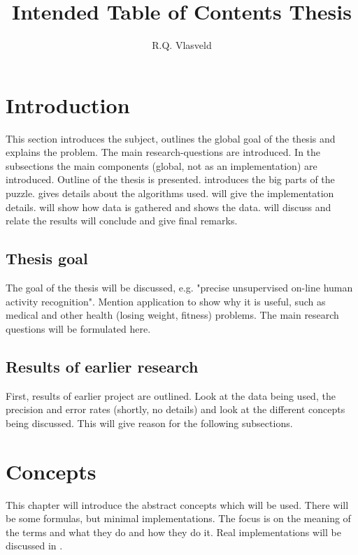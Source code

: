 \documentclass[a4paper,10pt]{extarticle}
\author{R.Q. Vlasveld}
\title{Intended Table of Contents Thesis}
\begin{document}
\maketitle
\tableofcontents

\section{Introduction}
\label{sec:Introduction}
This section introduces the subject, outlines the global goal of the thesis and explains the problem.
The main research-questions are introduced.
In the subsections the main components (global, not as an implementation) are introduced.
Outline of the thesis is presented.
 introduces the big parts of the puzzle.
 gives details about the algorithms used.
 will give the implementation details.
 will show how data is gathered and shows the data.
 will discuss and relate the results
 will conclude and give final remarks.


  \subsection{Thesis goal}
  The goal of the thesis will be discussed, e.g. "precise unsupervised on-line human activity recognition".
  Mention application to show why it is useful, such as medical and other health (losing weight, fitness) problems.
  The main research questions will be formulated here.

  \subsection{Results of earlier research}
  First, results of earlier project are outlined. Look at the data being used, the precision and error rates (shortly, no details) and look at the different concepts being discussed.
  This will give reason for the following subsections.

\section{Concepts}
\label{sec:Concepts}
This chapter will introduce the abstract concepts which will be used.
There will be some formulas, but minimal implementations.
The focus is on the meaning of the terms and what they do and how they do it.
Real implementations will be discussed in .
\end{document}
